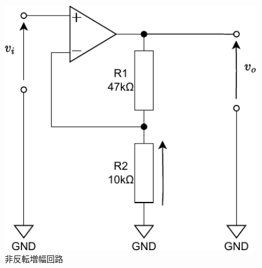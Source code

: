 \documentclass[report.tex]{subfiles}
\begin{document}
\begin{figure}[H]
	\centering
	\includegraphics[width=15cm]{fig/amp2.pdf}
	\caption{非反転増幅回路}
	\label{fig:amplifier-circuit2}
\end{figure}
\end{document}

